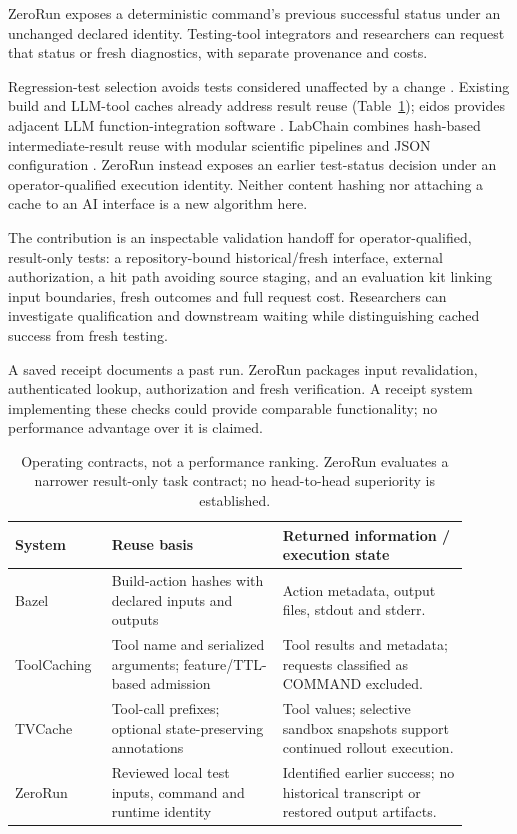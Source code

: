 \documentclass[preprint,12pt,a4paper]{elsarticle}
\begin{document}
ZeroRun exposes a deterministic command's previous successful status under an unchanged declared identity. Testing-tool integrators and researchers can request that status or fresh diagnostics, with separate provenance and costs.

Regression-test selection avoids tests considered unaffected by a change \cite{rothermel1997safe,yoo2012regression}. Existing build and LLM-tool caches already address result reuse (Table~\ref{tab:contracts}); eidos provides adjacent LLM function-integration software \cite{aldanamartin2025eidos}. LabChain combines hash-based intermediate-result reuse with modular scientific pipelines and JSON configuration \cite{couto2026labchain}. ZeroRun instead exposes an earlier test-status decision under an operator-qualified execution identity. Neither content hashing nor attaching a cache to an AI interface is a new algorithm here.

The contribution is an inspectable validation handoff for operator-qualified, result-only tests: a repository-bound historical/fresh interface, external authorization, a hit path avoiding source staging, and an evaluation kit linking input boundaries, fresh outcomes and full request cost. Researchers can investigate qualification and downstream waiting while distinguishing cached success from fresh testing.

A saved receipt documents a past run. ZeroRun packages input revalidation, authenticated lookup, authorization and fresh verification. A receipt system implementing these checks could provide comparable functionality; no performance advantage over it is claimed.

\begin{table}[htbp]
\centering\small
\begin{tabular}{@{}>{\raggedright\arraybackslash}p{0.17\linewidth}>{\raggedright\arraybackslash}p{0.35\linewidth}>{\raggedright\arraybackslash}p{0.38\linewidth}@{}}
\toprule
System & Reuse basis & Returned information / execution state \\
\midrule
Bazel \cite{bazelremotecache} & Build-action hashes with declared inputs and outputs & Action metadata, output files, stdout and stderr. \\
ToolCaching \cite{zhai2026toolcaching} & Tool name and serialized arguments; feature/TTL-based admission & Tool results and metadata; requests classified as COMMAND excluded. \\
TVCache \cite{kumar2026tvcache} & Tool-call prefixes; optional state-preserving annotations & Tool values; selective sandbox snapshots support continued rollout execution. \\
ZeroRun & Reviewed local test inputs, command and runtime identity & Identified earlier success; no historical transcript or restored output artifacts. \\
\bottomrule
\end{tabular}
\caption{Operating contracts, not a performance ranking. ZeroRun evaluates a narrower result-only task contract; no head-to-head superiority is established.}
\label{tab:contracts}
\end{table}
\end{document}
